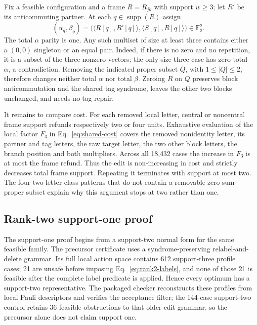\documentclass[a4paper,onecolumn,11pt,unpublished,noarxiv]{quantumarticle}
\begin{document}
Fix a feasible configuration and a frame $R=R_{jk}$ with support $w\ge3$; let $R'$ be its anticommuting partner.  At each $q\in\operatorname{supp}(R)$ assign
\begin{equation}
(\alpha_q,\beta_q)=\bigl(\langle R[q],R'[q]\rangle,\langle S[q],R[q]\rangle\bigr)\in\mathbb F_2^2.
\end{equation}
The total $\alpha$ parity is one.  Any such multiset of size at least three contains either a $(0,0)$ singleton or an equal pair.  Indeed, if there is no zero and no repetition, it is a subset of the three nonzero vectors; the only size-three case has zero total $\alpha$, a contradiction.  Removing the indicated proper subset $Q$, with $1\le|Q|\le2$, therefore changes neither total $\alpha$ nor total $\beta$.  Zeroing $R$ on $Q$ preserves block anticommutation and the shared tag syndrome, leaves the other two blocks unchanged, and needs no tag repair.

It remains to compare cost.  For each removed local letter, central or noncentral frame support refunds respectively two or four units.  Exhaustive evaluation of the local factor $F_3$ in Eq.~\eqref{eq:shared-cost} covers the removed nonidentity letter, its partner and tag letters, the raw target letter, the two other block letters, the branch position and both multipliers.  Across all 18,432 cases the increase in $F_3$ is at most the frame refund.  Thus the edit is non-increasing in cost and strictly decreases total frame support.  Repeating it terminates with support at most two.  The four two-letter class patterns that do not contain a removable zero-sum proper subset explain why this argument stops at two rather than one.

\subsection{Rank-two support-one proof}

The support-one proof begins from a support-two normal form for the same feasible family.  The precursor certificate uses a syndrome-preserving relabel-and-delete grammar.  Its full local action space contains 612 support-three profile cases; 21 are unsafe before imposing Eq.~\eqref{eq:rank2-labels}, and none of those 21 is feasible after the complete label predicate is applied.  Hence every optimum has a support-two representative.  The packaged checker reconstructs these profiles from local Pauli descriptors and verifies the acceptance filter; the 144-case support-two control retains 36 feasible obstructions to that older edit grammar, so the precursor alone does not claim support one.
\end{document}
